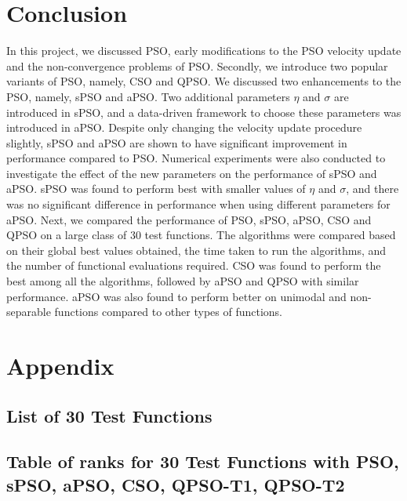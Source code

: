 \documentclass[12pt]{article}
\theoremstyle{definition}
\begin{document}
\newpage

\section{Conclusion}
In this project, we discussed PSO, early modifications to the PSO velocity update and the non-convergence problems of PSO. Secondly, we introduce two popular variants of PSO, namely, CSO and QPSO. We discussed two enhancements to the PSO, namely, sPSO and aPSO. Two additional parameters $\eta$ and $\sigma$ are introduced in sPSO, and a data-driven framework to choose these parameters was introduced in aPSO. Despite only changing the velocity update procedure slightly, sPSO and aPSO are shown to have significant improvement in performance compared to PSO. Numerical experiments were also conducted to investigate the effect of the new parameters on the performance of sPSO and aPSO. sPSO was found to perform best with smaller values of $\eta$ and $\sigma$, and there was no significant difference in performance when using different parameters for aPSO. Next, we compared the performance of PSO, sPSO, aPSO, CSO and QPSO on a large class of 30 test functions. The algorithms were compared based on their global best values obtained, the time taken to run the algorithms, and the number of functional evaluations required. CSO was found to perform the best among all the algorithms, followed by aPSO and QPSO with similar performance. aPSO was also found to perform better on unimodal and non-separable functions compared to other types of functions.

\newpage

\section{Appendix}
\subsection{List of 30 Test Functions}
\label{subsection:function info}
\renewcommand{\arraystretch}{0.6}

\renewcommand{\arraystretch}{1}

\newpage

\subsection{Table of ranks for 30 Test Functions with PSO, sPSO, aPSO, CSO, QPSO-T1, QPSO-T2}
\label{subsection:compareall ranks table}
\renewcommand{\arraystretch}{0.6}
\begin{footnotesize}

\end{footnotesize}
\renewcommand{\arraystretch}{1}
\end{document}
